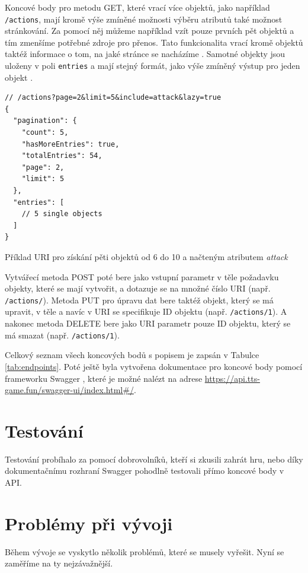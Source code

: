 Koncové body pro metodu GET, které vrací více objektů, jako například \texttt{/actions}, mají kromě výše zmíněné možnosti výběru atributů také možnost stránkování. Za pomocí něj můžeme například vzít pouze prvních pět objektů a tím zmenšíme potřebné zdroje pro přenos. Tato funkcionalita vrací kromě objektů taktéž informace o tom, na jaké stránce se nacházíme . Samotné objekty jsou uloženy v poli \texttt{entries} a mají stejný formát, jako výše zmíněný výstup pro jeden objekt .

\begin{listing}[h!]
    \begin{verbatim}
// /actions?page=2&limit=5&include=attack&lazy=true
{
  "pagination": {
    "count": 5,
    "hasMoreEntries": true,
    "totalEntries": 54,
    "page": 2,
    "limit": 5
  },
  "entries": [ 
    // 5 single objects
  ]
}
    \end{verbatim}
    \caption{Příklad URI pro získání pěti objektů od 6 do 10 a načteným atributem \textit{attack}}
    \label{code:action:endpoint:multiple}
\end{listing}

Vytvářecí metoda POST poté bere jako vstupní parametr v těle požadavku objekty, které se mají vytvořit, a dotazuje se na množné číslo URI (např. \texttt{/actions/}). Metoda PUT pro úpravu dat bere taktéž objekt, který se má upravit, v těle a navíc v URI se specifikuje ID objektu (např. \texttt{/actions/1}). A nakonec metoda DELETE bere jako URI parametr pouze ID objektu, který se má smazat (např. \texttt{/actions/1}).

Celkový seznam všech koncových bodů s popisem je zapsán v Tabulce \ref{tab:endpoints}. Poté ještě byla vytvořena dokumentace pro koncové body pomocí frameworku Swagger , které je možné nalézt na adrese \url{https://api.tts-game.fun/swagger-ui/index.html#/}.


\section{Testování}\label{sec:testing}
Testování probíhalo za pomocí dobrovolníků, kteří si zkusili zahrát hru, nebo díky dokumentačnímu rozhraní Swagger  pohodlně testovali přímo koncové body v API.



\section{Problémy při vývoji}\label{sec:impl:problems}
Během vývoje se vyskytlo několik problémů, které se musely vyřešit. Nyní se zaměříme na ty nejzávažnější.

